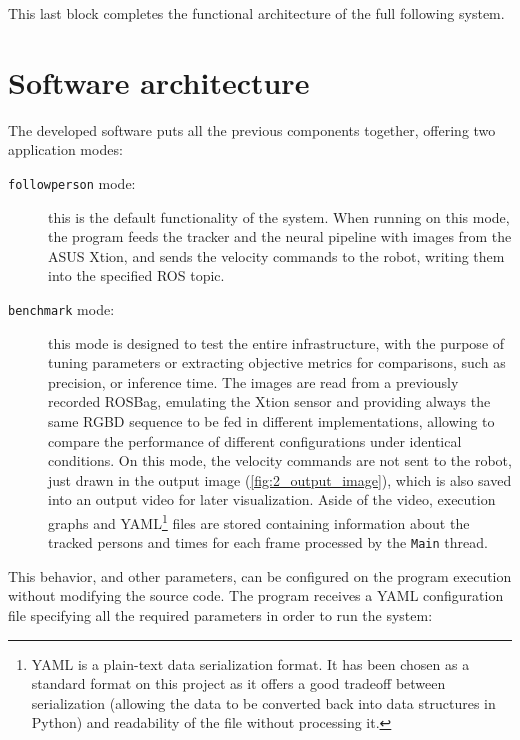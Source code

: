 This last block completes the functional architecture of the full following system.

\section{Software architecture}

The developed software puts all the previous components together, offering two application modes:
\begin{description}
	\item[\texttt{followperson} mode:] this is the default functionality of the system. When running on this mode, the program feeds the tracker and the neural pipeline with images from the ASUS Xtion, and sends the velocity commands to the robot, writing them into the specified ROS topic.
	
	\item[\texttt{benchmark} mode:] this mode is designed to test the entire infrastructure, with the purpose of tuning parameters or extracting objective metrics for comparisons, such as precision, or inference time. The images are read from a previously recorded ROSBag, emulating the Xtion sensor and providing always the same RGBD sequence to be fed in different implementations, allowing to compare the performance of different configurations under identical conditions. On this mode, the velocity commands are not sent to the robot, just drawn in the output image (\autoref{fig:2_output_image}), which is also saved into an output video for later visualization. Aside of the video, execution graphs and YAML\footnote{YAML is a plain-text data serialization format. It has been chosen as a standard format on this project as it offers a good tradeoff between serialization (allowing the data to be converted back into data structures in Python) and  readability of the file without processing it.} files are stored containing information about the tracked persons and times for each frame processed by the \texttt{Main} thread.
\end{description}

This behavior, and other parameters, can be configured on the program execution without modifying the source code. The program receives a YAML configuration file specifying all the required parameters in order to run the system:

